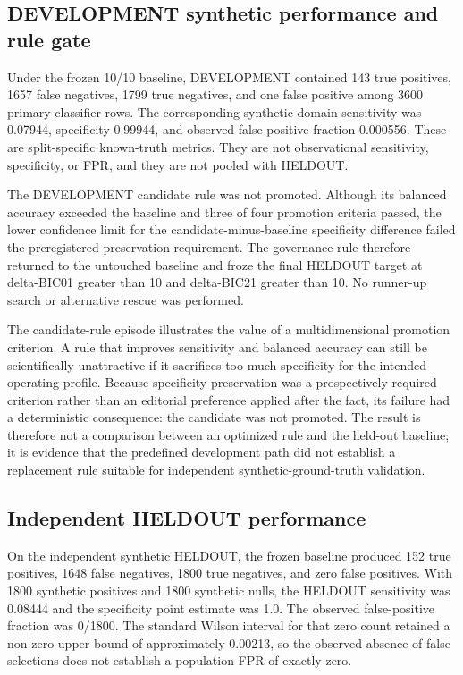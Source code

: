 \documentclass[11pt,a4paper]{article}
\begin{document}
\subsection{DEVELOPMENT synthetic performance and rule gate}
Under the frozen 10/10 baseline, DEVELOPMENT contained 143 true positives, 1657 false negatives, 1799 true negatives, and one false positive among 3600 primary classifier rows. The corresponding synthetic-domain sensitivity was 0.07944, specificity 0.99944, and observed false-positive fraction 0.000556. These are split-specific known-truth metrics. They are not observational sensitivity, specificity, or FPR, and they are not pooled with HELDOUT.

The DEVELOPMENT candidate rule was not promoted. Although its balanced accuracy exceeded the baseline and three of four promotion criteria passed, the lower confidence limit for the candidate-minus-baseline specificity difference failed the preregistered preservation requirement. The governance rule therefore returned to the untouched baseline and froze the final HELDOUT target at delta-BIC01 greater than 10 and delta-BIC21 greater than 10. No runner-up search or alternative rescue was performed.

The candidate-rule episode illustrates the value of a multidimensional promotion criterion. A rule that improves sensitivity and balanced accuracy can still be scientifically unattractive if it sacrifices too much specificity for the intended operating profile. Because specificity preservation was a prospectively required criterion rather than an editorial preference applied after the fact, its failure had a deterministic consequence: the candidate was not promoted. The result is therefore not a comparison between an optimized rule and the held-out baseline; it is evidence that the predefined development path did not establish a replacement rule suitable for independent synthetic-ground-truth validation.

\subsection{Independent HELDOUT performance}
On the independent synthetic HELDOUT, the frozen baseline produced 152 true positives, 1648 false negatives, 1800 true negatives, and zero false positives. With 1800 synthetic positives and 1800 synthetic nulls, the HELDOUT sensitivity was 0.08444 and the specificity point estimate was 1.0. The observed false-positive fraction was 0/1800. The standard Wilson interval for that zero count retained a non-zero upper bound of approximately 0.00213, so the observed absence of false selections does not establish a population FPR of exactly zero.
\end{document}
